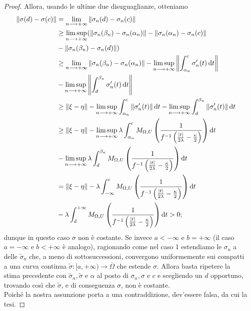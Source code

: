 \begin{proof}
    Allora, usando le ultime due disuguaglianze, otteniamo
    \begin{align*}
        \|\sigma(d)-\sigma(c)\|&=\lim_{n\longrightarrow+\infty}\|\sigma_n(d)-\sigma_n(c)\|\\
        &\ge\limsup_{n\longrightarrow+\infty}(\|\sigma_n(\beta_n)-\sigma_n(\alpha_n)\|-\|\sigma_n(\alpha_n)-\sigma_n(c)\|\\
        &-\|\sigma_n(\beta_n)-\sigma_n(d)\|)\\
        &\ge\lim_{n\longrightarrow+\infty}\|\sigma_n(\beta_n)-\sigma_n(\alpha_n)\|-\limsup_{n\longrightarrow+\infty}\left\|\int_{\alpha_n}^c \sigma_n'(t)\diff t\right\|\\
        &-\limsup_{n\longrightarrow+\infty}\left\|\int_d^{\beta_n} \sigma_n'(t)\diff t\right\|\\
        &\ge\|\xi-\eta\|-\limsup_{n\longrightarrow+\infty}\int_{\alpha_n}^c \|\sigma_n'(t)\|\diff t-\limsup_{n\longrightarrow+\infty}\int_d^{\beta_n} \|\sigma_n'(t)\|\diff t\\
        &\ge\|\xi-\eta\|-\limsup_{n\longrightarrow+\infty}\lambda\int_{\alpha_n}^c M_{\Omega,U}\left(\frac{1}{f^{-1}\left(\frac{|t|}{2\lambda}-\frac{\kappa}{2}\right)}\right)\diff t\\
        &-\limsup_{n\longrightarrow+\infty}\lambda\int_d^{\beta_n} M_{\Omega,U}\left(\frac{1}{f^{-1}\left(\frac{|t|}{2\lambda}-\frac{\kappa}{2}\right)}\right)\diff t\\
        &=\|\xi-\eta\|-\lambda\int_{-\infty}^c M_{\Omega,U}\left(\frac{1}{f^{-1}\left(\frac{|t|}{2\lambda}-\frac{\kappa}{2}\right)}\right)\diff t\\
        &-\lambda\int_d^{+\infty} M_{\Omega,U}\left(\frac{1}{f^{-1}\left(\frac{|t|}{2\lambda}-\frac{\kappa}{2}\right)}\right)\diff t>0;
    \end{align*}
    dunque in questo caso $\sigma$ non è costante. Se invece $a<-\infty$ e $b=+\infty$ (il caso $a=-\infty$ e $b<+\infty$ è analogo), ragionando come nel caso 1 estendiamo le $\sigma_n$ a delle $\tilde{\sigma}_n$ che, a meno di sottosuccessioni, convergono uniformemente sui compatti a una curva continua $\tilde{\sigma}:[a,+\infty)\longrightarrow\overline{\Omega}$ che estende $\sigma$. Allora basta ripetere la stima precedente con $\tilde{\sigma}_n, \tilde{\sigma}$ e $\alpha$ al posto di $\sigma_n, \sigma$ e $c$ e scegliendo un $d$ opportuno, trovando così che $\tilde{\sigma}$, e di conseguenza $\sigma$, non è costante. \\

    Poiché la nostra assunzione porta a una contraddizione, dev'essere falsa, da cui la tesi.
\end{proof}

